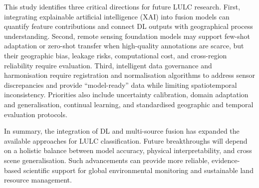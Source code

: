 \documentclass[]{interact}
\theoremstyle{plain}%
\theoremstyle{definition}
\theoremstyle{remark}
\begin{document}
This study identifies three critical directions for future LULC research. First, integrating explainable artificial intelligence (XAI) into fusion models can quantify feature contributions and connect DL outputs with geographical process understanding. Second, remote sensing foundation models may support few-shot adaptation or zero-shot transfer when high-quality annotations are scarce, but their geographic bias, leakage risks, computational cost, and cross-region reliability require evaluation. Third, intelligent data governance and harmonisation require registration and normalisation algorithms to address sensor discrepancies and provide ``model-ready'' data while limiting spatiotemporal inconsistency. Priorities also include uncertainty calibration, domain adaptation and generalisation, continual learning, and standardised geographic and temporal evaluation protocols.

In summary, the integration of DL and multi-source fusion has expanded the available approaches for LULC classification. Future breakthroughs will depend on a holistic balance between model accuracy, physical interpretability, and cross scene generalisation. Such advancements can provide more reliable, evidence-based scientific support for global environmental monitoring and sustainable land resource management.




\end{document}
